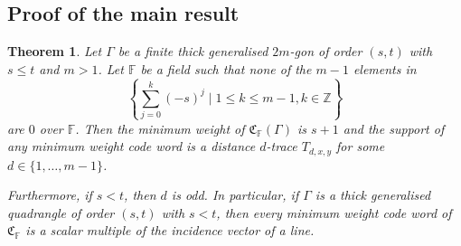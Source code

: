 \documentclass[12pt]{article}
\newcommand{\F}{\mathbb{F}}
\newcommand{\Z}{\mathbb{Z}}
\newcommand{\Code}{\mathfrak{C}_\F}
\newtheorem{theorem}{Theorem}
\theoremstyle{remark}
\begin{document}
\subsection{Proof of the main result}
\begin{theorem}\label{main}
	Let \(\Gamma\) be a finite thick generalised \(2m\)-gon of order \((s,t)\) with \(s\le t\) and \(m>1\). 
	Let \(\F\) be a field such that none of the $m-1$ elements in 
    \[\left\{\sum_{j=0}^{k} (-s)^{j} \mid  1\le k \leq m-1, k\in \Z\right\}\]
    are \(0\) over \(\F\). 
	Then the minimum weight of \(\Code(\Gamma)\) is \(s+1\) and the support of any minimum weight code word is a distance $d$-trace $T_{d,x,y}$ for some $d\in \{1,\ldots,m-1\}$.

    Furthermore, if $s<t$, then $d$ is odd. In particular, if $\Gamma$ is a thick generalised quadrangle of order $(s,t)$ with $s<t$, then every minimum weight code word of $\Code$ is a scalar multiple of the incidence vector of a line.
\end{theorem}
\end{document}
